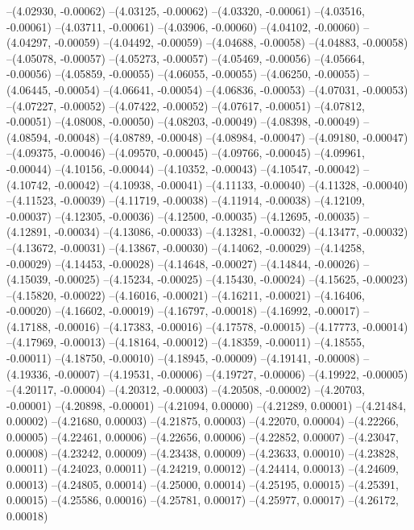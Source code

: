 --(4.02930, -0.00062)
--(4.03125, -0.00062)
--(4.03320, -0.00061)
--(4.03516, -0.00061)
--(4.03711, -0.00061)
--(4.03906, -0.00060)
--(4.04102, -0.00060)
--(4.04297, -0.00059)
--(4.04492, -0.00059)
--(4.04688, -0.00058)
--(4.04883, -0.00058)
--(4.05078, -0.00057)
--(4.05273, -0.00057)
--(4.05469, -0.00056)
--(4.05664, -0.00056)
--(4.05859, -0.00055)
--(4.06055, -0.00055)
--(4.06250, -0.00055)
--(4.06445, -0.00054)
--(4.06641, -0.00054)
--(4.06836, -0.00053)
--(4.07031, -0.00053)
--(4.07227, -0.00052)
--(4.07422, -0.00052)
--(4.07617, -0.00051)
--(4.07812, -0.00051)
--(4.08008, -0.00050)
--(4.08203, -0.00049)
--(4.08398, -0.00049)
--(4.08594, -0.00048)
--(4.08789, -0.00048)
--(4.08984, -0.00047)
--(4.09180, -0.00047)
--(4.09375, -0.00046)
--(4.09570, -0.00045)
--(4.09766, -0.00045)
--(4.09961, -0.00044)
--(4.10156, -0.00044)
--(4.10352, -0.00043)
--(4.10547, -0.00042)
--(4.10742, -0.00042)
--(4.10938, -0.00041)
--(4.11133, -0.00040)
--(4.11328, -0.00040)
--(4.11523, -0.00039)
--(4.11719, -0.00038)
--(4.11914, -0.00038)
--(4.12109, -0.00037)
--(4.12305, -0.00036)
--(4.12500, -0.00035)
--(4.12695, -0.00035)
--(4.12891, -0.00034)
--(4.13086, -0.00033)
--(4.13281, -0.00032)
--(4.13477, -0.00032)
--(4.13672, -0.00031)
--(4.13867, -0.00030)
--(4.14062, -0.00029)
--(4.14258, -0.00029)
--(4.14453, -0.00028)
--(4.14648, -0.00027)
--(4.14844, -0.00026)
--(4.15039, -0.00025)
--(4.15234, -0.00025)
--(4.15430, -0.00024)
--(4.15625, -0.00023)
--(4.15820, -0.00022)
--(4.16016, -0.00021)
--(4.16211, -0.00021)
--(4.16406, -0.00020)
--(4.16602, -0.00019)
--(4.16797, -0.00018)
--(4.16992, -0.00017)
--(4.17188, -0.00016)
--(4.17383, -0.00016)
--(4.17578, -0.00015)
--(4.17773, -0.00014)
--(4.17969, -0.00013)
--(4.18164, -0.00012)
--(4.18359, -0.00011)
--(4.18555, -0.00011)
--(4.18750, -0.00010)
--(4.18945, -0.00009)
--(4.19141, -0.00008)
--(4.19336, -0.00007)
--(4.19531, -0.00006)
--(4.19727, -0.00006)
--(4.19922, -0.00005)
--(4.20117, -0.00004)
--(4.20312, -0.00003)
--(4.20508, -0.00002)
--(4.20703, -0.00001)
--(4.20898, -0.00001)
--(4.21094, 0.00000)
--(4.21289, 0.00001)
--(4.21484, 0.00002)
--(4.21680, 0.00003)
--(4.21875, 0.00003)
--(4.22070, 0.00004)
--(4.22266, 0.00005)
--(4.22461, 0.00006)
--(4.22656, 0.00006)
--(4.22852, 0.00007)
--(4.23047, 0.00008)
--(4.23242, 0.00009)
--(4.23438, 0.00009)
--(4.23633, 0.00010)
--(4.23828, 0.00011)
--(4.24023, 0.00011)
--(4.24219, 0.00012)
--(4.24414, 0.00013)
--(4.24609, 0.00013)
--(4.24805, 0.00014)
--(4.25000, 0.00014)
--(4.25195, 0.00015)
--(4.25391, 0.00015)
--(4.25586, 0.00016)
--(4.25781, 0.00017)
--(4.25977, 0.00017)
--(4.26172, 0.00018)
